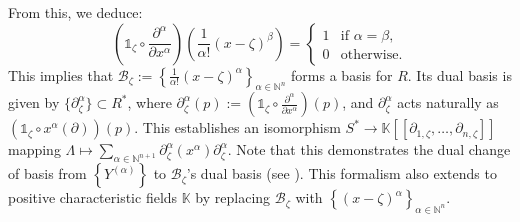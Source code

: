 \documentclass[a4paper,11p]{amsart}
\begin{document}
%


From this, we deduce:
\[
\left( \mathds{1}_\zeta \circ \frac{\partial^\alpha}{\partial x^\alpha} \right) \left( \frac{1}{\alpha!} (x - \zeta)^\beta \right) =
\begin{cases}
1 & \text{if } \alpha = \beta, \\
0 & \text{otherwise}.
\end{cases}
\]
This implies that $\mathcal{B}_\zeta := \left\{ \frac{1}{\alpha!}(x - \zeta)^\alpha \right\}_{\alpha \in \mathbb{N}^n}$ forms a basis for $R$. Its dual basis is given by $ \{\partial^\alpha_\zeta\} \subset R^* $, where $ \partial^\alpha_\zeta(p) := \left( \mathds{1}_\zeta \circ \frac{\partial^\alpha}{\partial x^\alpha} \right)(p) $, and $\partial^{\alpha}_{\zeta}$ acts naturally as $\left(\mathds{1}_{\zeta} \circ x^{\alpha}(\partial)\right)(p)$. This establishes an isomorphism $S^* \to \mathbb{K}[[\partial_{1, \zeta},\ldots,\partial_{n, \zeta}]]$ mapping $\Lambda \mapsto \sum_{\alpha\in \mathbb N^{n+1}} \partial^{\alpha}_{\zeta}(x^{\alpha}) \partial^{\alpha}_{\zeta}$. Note that this demonstrates the dual change of basis from $\left\{Y^{(\alpha)}\right\}$ to $\mathcal{B}_\zeta$'s dual basis (see ). This formalism also extends to positive characteristic fields $\mathbb{K}$ by replacing $\mathcal{B}_\zeta$ with $\left\{(x-\zeta)^\alpha\right\}_{\alpha \in \mathbb{N}^n}$.
\end{document}
